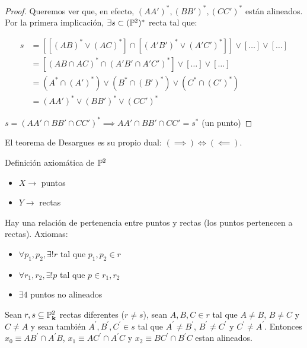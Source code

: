 \begin{proof}
Queremos ver que, en efecto, $\left(AA'\right)^*, \left(BB'\right)^*, \left(CC'\right)^*$ están alineados. Por la primera implicación,
$\exists s \subset (\mathbb{P}^2)^*$ recta tal que:

\begin{align*}
    s &= \left[ \left[ \left(AB\right)^* \vee \left(AC\right)^* \right] \cap \left[ \left(A'B'\right)^* \vee \left(A'C'\right)^* \right] \right]
    \vee [\dots ] \vee [\dots] \\
    &= \left[ (AB \cap AC)^* \cap \left(A'B' \cap A'C' \right)^* \right] \vee [\dots] \vee [\dots] \\
    &= \left(A^* \cap (A')^* \right) \vee \left(B^* \cap (B')^* \right) \vee \left(C^* \cap (C')^* \right) \\
    &= (AA')^* \vee (BB')^* \vee (CC')^*
\end{align*}

$s = (AA' \cap BB' \cap CC')^* \implies AA' \cap BB' \cap CC' = s^*$ (un punto)
\end{proof}
\begin{obs}
El teorema de Desargues es su propio dual: $(\implies) \iff (\impliedby)$.
\end{obs}
\begin{obs}
Definición axiomática de $\mathbb{P}^2$
\begin{itemize}
    \item $X \rightarrow$ puntos
    \item $Y \rightarrow$ rectas
\end{itemize}
Hay una relación de pertenencia entre puntos y rectas (los puntos pertenecen a rectas). Axiomas:
\begin{itemize}
    \item $\forall p_1, p_2, \exists! r$ tal que $p_1, p_2 \in r$
    \item $\forall r_1, r_2, \exists! p$ tal que $p \in r_1, r_2$
    \item $\exists 4$ puntos no alineados
\end{itemize}
\end{obs}


\begin{thm}[ de Pappus]
Sean $r,s \subseteq \mathbb{P}^2_{\mathbf{k}}$ rectas diferentes ($r \neq s$), sean
$A,B,C \in r$ tal que $A \neq B$, $B \neq C$ y $C\neq A$ y sean también
$A^\prime,B^\prime,C^\prime \in s$ tal que $A^\prime \neq B^\prime$,
$B^\prime \neq C^\prime$ y $C^\prime \neq A^\prime$. Entonces
$x_0 \equiv AB^\prime \cap A^\prime B$, $x_1 \equiv AC^\prime \cap A^\prime C$
y $x_2 \equiv BC^\prime \cap B^\prime C$ estan alineados.
\end{thm}

